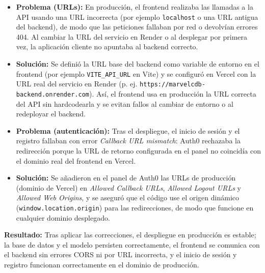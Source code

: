 \begin{itemize}
    \item \textbf{Problema (URLs):} En producción, el frontend realizaba las llamadas a la API usando una URL incorrecta (por ejemplo \texttt{localhost} o una URL antigua del backend), de modo que las peticiones fallaban por red o devolvían errores 404. Al cambiar la URL del servicio en Render o al desplegar por primera vez, la aplicación cliente no apuntaba al backend correcto.
    \item \textbf{Solución:} Se definió la URL base del backend como variable de entorno en el frontend (por ejemplo \texttt{VITE\_API\_URL} en Vite) y se configuró en Vercel con la URL real del servicio en Render (p. ej. \texttt{https://marvelcdb-backend.onrender.com}). Así, el frontend usa en producción la URL correcta del API sin hardcodearla y se evitan fallos al cambiar de entorno o al redeployar el backend.

    \item \textbf{Problema (autenticación):} Tras el despliegue, el inicio de sesión y el registro fallaban con error \textit{Callback URL mismatch}: Auth0 rechazaba la redirección porque la URL de retorno configurada en el panel no coincidía con el dominio real del frontend en Vercel.
    \item \textbf{Solución:} Se añadieron en el panel de Auth0 las URLs de producción (dominio de Vercel) en \textit{Allowed Callback URLs}, \textit{Allowed Logout URLs} y \textit{Allowed Web Origins}, y se aseguró que el código use el origen dinámico (\texttt{window.location.origin}) para las redirecciones, de modo que funcione en cualquier dominio desplegado.
\end{itemize}

\textbf{Resultado:} Tras aplicar las correcciones, el despliegue en producción es estable; la base de datos y el modelo persisten correctamente, el frontend se comunica con el backend sin errores CORS ni por URL incorrecta, y el inicio de sesión y registro funcionan correctamente en el dominio de producción.
